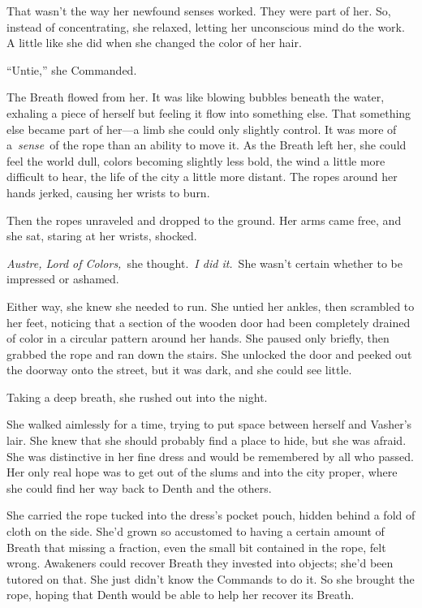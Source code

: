 That wasn’t the way her newfound senses worked. They were part of her. So, instead of concentrating, she relaxed, letting her unconscious mind do the work. A little like she did when she changed the color of her hair.

“Untie,” she Commanded.

The Breath flowed from her. It was like blowing bubbles beneath the water, exhaling a piece of herself but feeling it flow into something else. That something else became part of her—a limb she could only slightly control. It was more of a~\textit{sense}~of the rope than an ability to move it. As the Breath left her, she could feel the world dull, colors becoming slightly less bold, the wind a little more difficult to hear, the life of the city a little more distant. The ropes around her hands jerked, causing her wrists to burn.

Then the ropes unraveled and dropped to the ground. Her arms came free, and she sat, staring at her wrists, shocked.

\textit{Austre, Lord of Colors,}~she thought.~\textit{I did it.}~She wasn’t certain whether to be impressed or ashamed.

Either way, she knew she needed to run. She untied her ankles, then scrambled to her feet, noticing that a section of the wooden door had been completely drained of color in a circular pattern around her hands. She paused only briefly, then grabbed the rope and ran down the stairs. She unlocked the door and peeked out the doorway onto the street, but it was dark, and she could see little.

Taking a deep breath, she rushed out into the night.

\orn

She walked aimlessly for a time, trying to put space between herself and Vasher’s lair. She knew that she should probably find a place to hide, but she was afraid. She was distinctive in her fine dress and would be remembered by all who passed. Her only real hope was to get out of the slums and into the city proper, where she could find her way back to Denth and the others.

She carried the rope tucked into the dress’s pocket pouch, hidden behind a fold of cloth on the side. She’d grown so accustomed to having a certain amount of Breath that missing a fraction, even the small bit contained in the rope, felt wrong. Awakeners could recover Breath they invested into objects; she’d been tutored on that. She just didn’t know the Commands to do it. So she brought the rope, hoping that Denth would be able to help her recover its Breath.

